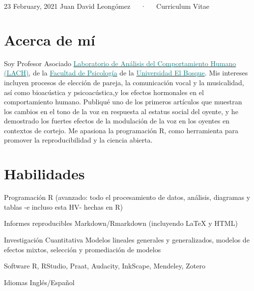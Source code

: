 \documentclass[11pt, a4paper]{awesome-cv}
\begin{document}
\makecvheader

\makecvfooter
  {23 February, 2021}
    {Juan David Leongómez~~~·~~~Curriculum Vitae}
  {\thepage}





\hypertarget{acerca-de-muxed}{%
\section{Acerca de mí}\label{acerca-de-muxed}}

Soy Profesor Asociado
\href{https://sites.google.com/unbosque.edu.co/lach-es}{\textcolor{teal}{Laboratorio de Análisis del Comportamiento Humano (LACH)}},
de la
\href{https://www.uelbosque.edu.co/psicologia}{\textcolor{teal}{Facultad de Psicología}}
de la
\href{https://www.uelbosque.edu.co/}{\textcolor{teal}{Universidad El Bosque}}.
Mis intereses incluyen procesos de elección de pareja, la comunicación
vocal y la musicalidad, así como bioacústica y psicoacústica,y los
efectos hormonales en el comportamiento humano. Publiqué uno de los
primeros artículos que muestran los cambios en el tono de la voz en
respuesta al estatus social del oyente, y he demostrado los fuertes
efectos de la modulación de la voz en los oyentes en contextos de
cortejo. Me apasiona la programación R, como herramienta para promover
la reproducibilidad y la ciencia abierta.

\hypertarget{habilidades}{%
\section{Habilidades}\label{habilidades}}

\begin{cvskills}
  \cvskill
    {Programación}
    {R (avanzado: todo el procesamiento de datos, análisis, diagramas y tablas -e incluso esta HV- hechas en R)}

  \cvskill
    {Informes reproducibles}
    {Markdown/Rmarkdown (incluyendo {\selectfont\LaTeX} y HTML)}

  \cvskill
    {Investigación Cuantitativa}
    {Modelos lineales generales y generalizados, modelos de efectos mixtos, selección y promediación de modelos}

  \cvskill
    {Software}
    {R, RStudio, Praat, Audacity, InkScape, Mendeley, Zotero}

  \cvskill
    {Idiomas}
    {Inglés/Español}
\end{cvskills}
\end{document}
